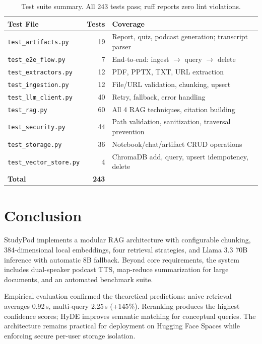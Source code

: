 \documentclass[11pt, letterpaper]{article}
\begin{document}
\begin{table}[H]
\centering\small
\begin{tabularx}{\textwidth}{@{}l r X@{}}
\toprule
\textbf{Test File} & \textbf{Tests} & \textbf{Coverage} \\
\midrule
\texttt{test\_artifacts.py}     & 19 & Report, quiz, podcast generation; transcript parser \\
\texttt{test\_e2e\_flow.py}     &  7 & End-to-end: ingest $\to$ query $\to$ delete \\
\texttt{test\_extractors.py}    & 12 & PDF, PPTX, TXT, URL extraction \\
\texttt{test\_ingestion.py}     & 12 & File/URL validation, chunking, upsert \\
\texttt{test\_llm\_client.py}   & 40 & Retry, fallback, error handling \\
\texttt{test\_rag.py}           & 60 & All 4 RAG techniques, citation building \\
\texttt{test\_security.py}      & 44 & Path validation, sanitization, traversal prevention \\
\texttt{test\_storage.py}       & 36 & Notebook/chat/artifact CRUD operations \\
\texttt{test\_vector\_store.py} &  4 & ChromaDB add, query, upsert idempotency, delete \\
\midrule
\textbf{Total}                  & \textbf{243} & \\
\bottomrule
\end{tabularx}
\caption{Test suite summary.  All 243 tests pass; ruff reports zero lint violations.}
\end{table}

\section{Conclusion}

StudyPod implements a modular RAG architecture with configurable chunking,
384-dimensional local embeddings, four retrieval strategies, and Llama 3.3 70B
inference with automatic 8B fallback.  Beyond core requirements, the system
includes dual-speaker podcast TTS, map-reduce summarization for large documents,
and an automated benchmark suite.

Empirical evaluation confirmed the theoretical predictions: naive retrieval
averages 0.92\,s, multi-query 2.25\,s (+145\%).  Reranking produces the
highest confidence scores; HyDE improves semantic matching for conceptual
queries.  The architecture remains practical for deployment on Hugging Face
Spaces while enforcing secure per-user storage isolation.
\end{document}
